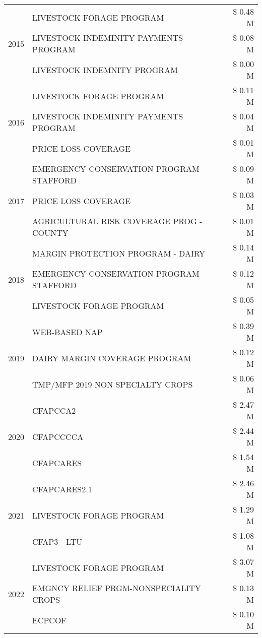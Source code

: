 \begin{tabular}{llr}
\multirow[t]{3}{*}{2015} & LIVESTOCK FORAGE PROGRAM & \$ 0.48 M \\
 & LIVESTOCK INDEMINITY PAYMENTS PROGRAM & \$ 0.08 M \\
 & LIVESTOCK INDEMNITY PROGRAM & \$ 0.00 M \\
\cline{1-3}
\multirow[t]{3}{*}{2016} & LIVESTOCK FORAGE PROGRAM & \$ 0.11 M \\
 & LIVESTOCK INDEMINITY PAYMENTS PROGRAM & \$ 0.04 M \\
 & PRICE LOSS COVERAGE & \$ 0.01 M \\
\cline{1-3}
\multirow[t]{3}{*}{2017} & EMERGENCY CONSERVATION PROGRAM STAFFORD & \$ 0.09 M \\
 & PRICE LOSS COVERAGE & \$ 0.03 M \\
 & AGRICULTURAL RISK COVERAGE PROG - COUNTY & \$ 0.01 M \\
\cline{1-3}
\multirow[t]{3}{*}{2018} & MARGIN PROTECTION PROGRAM - DAIRY & \$ 0.14 M \\
 & EMERGENCY CONSERVATION PROGRAM STAFFORD & \$ 0.12 M \\
 & LIVESTOCK FORAGE PROGRAM & \$ 0.05 M \\
\cline{1-3}
\multirow[t]{3}{*}{2019} & WEB-BASED NAP & \$ 0.39 M \\
 & DAIRY MARGIN COVERAGE PROGRAM & \$ 0.12 M \\
 & TMP/MFP 2019 NON SPECIALTY CROPS & \$ 0.06 M \\
\cline{1-3}
\multirow[t]{3}{*}{2020} & CFAPCCA2 & \$ 2.47 M \\
 & CFAPCCCCA & \$ 2.44 M \\
 & CFAPCARES & \$ 1.54 M \\
\cline{1-3}
\multirow[t]{3}{*}{2021} & CFAPCARES2.1 & \$ 2.46 M \\
 & LIVESTOCK FORAGE PROGRAM & \$ 1.29 M \\
 & CFAP3 - LTU & \$ 1.08 M \\
\cline{1-3}
\multirow[t]{3}{*}{2022} & LIVESTOCK FORAGE PROGRAM & \$ 3.07 M \\
 & EMGNCY RELIEF PRGM-NONSPECIALITY CROPS & \$ 0.13 M \\
 & ECPCOF & \$ 0.10 M \\
\cline{1-3}
\bottomrule
\end{tabular}
